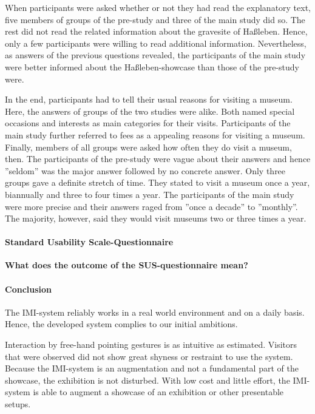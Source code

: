 When participants were asked whether or not they had read the explanatory text, five members of groups of the pre-study and three of the main study did so. The rest did not read the related information about the gravesite of Haßleben. Hence, only a few participants were willing to read additional information. Nevertheless, as answers of the previous questions revealed, the participants of the main study were better informed about the Haßleben-showcase than those of the pre-study were.  

In the end, participants had to tell their usual reasons for visiting a museum. Here, the answers of groups of the two studies were alike. Both named special occasions and interests as main categories for their visits. Participants of the main study further referred to fees as a appealing reasons for visiting a museum.
\\
Finally, members of all groups were asked how often they do visit a museum, then. The participants of the pre-study were vague about their answers and hence ''seldom'' was the major answer followed by no concrete answer. Only three groups gave a definite stretch of time. They stated to visit a museum once a year, biannually and three to four times a year. The participants of the main study were more precise and their answers raged from ''once a decade'' to ''monthly''. The majority, however, said they would visit museums two or three times a year.


\paragraph{Standard Usability Scale-Questionnaire}

\textbf{What does the outcome of the \ac{SUS}-questionnaire mean?}


\paragraph{Conclusion}

The \ac{IMI}-system reliably works in a real world environment and on a daily basis. Hence, the developed system complies to our initial ambitions.

Interaction by free-hand pointing gestures is as intuitive as estimated. Visitors that were observed did not show great shyness or restraint to use the system. Because the \ac{IMI}-system is an augmentation and not a fundamental part of the showcase, the exhibition is not disturbed. With low cost and little effort, the \ac{IMI}-system is able to augment a showcase of an exhibition or other presentable setups.



